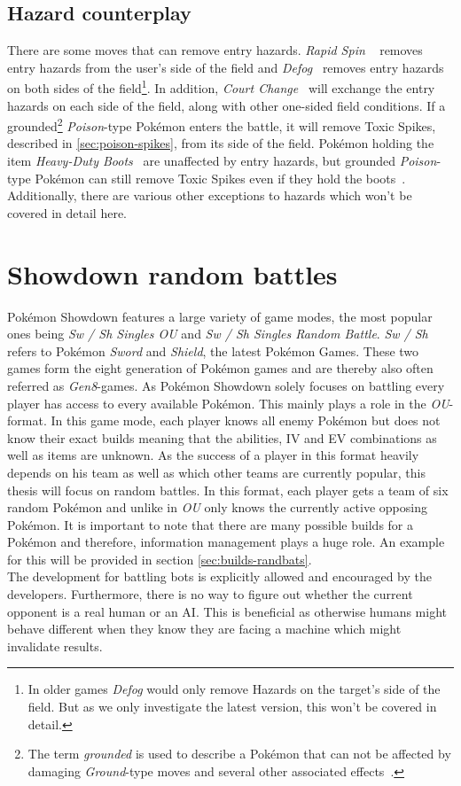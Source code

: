 \subsection{Hazard counterplay}
There are some moves that can remove entry hazards. \textit{Rapid Spin} 
~\autocite{Bulbapedia:RapidSpin} removes entry hazards from the user's side of the field and
\textit{Defog}~\autocite{Bulbapedia:Defog} removes entry hazards on both sides of the 
field\footnote{In older games \textit{Defog} would only remove Hazards on the
target's side of the field. But as we only investigate the latest version, this
won't be covered in detail.}. In addition, 
\textit{Court Change}~\autocite{Bulbapedia:CourtChange} will exchange the entry hazards
on each side of the field, along with other one-sided field conditions.
If a grounded\footnote{The term \textit{grounded} is used to describe a Pokémon that
can not be affected by damaging \textit{Ground}-type moves and several other associated 
effects~\autocite{Bulbapedia:Grounded}.}
\textit{Poison}-type Pokémon enters the battle, it will remove Toxic 
Spikes, described in \ref{sec:poison-spikes}, from its side of the field.
Pokémon holding the item 
\textit{Heavy-Duty Boots}~\autocite{Bulbapedia:HeavyDutyBoots} are unaffected by
entry hazards, but grounded \textit{Poison}-type Pokémon can still remove
Toxic Spikes even if they hold the boots~\autocite{Bulbapedia:EntryHazards}.
Additionally, there are various other exceptions to hazards which won't be covered in detail here.

\section{Showdown random battles}
Pokémon Showdown features a large variety of game modes, the most popular ones being \textit{Sw / Sh Singles OU} and
\textit{Sw / Sh Singles Random Battle}. \textit{Sw / Sh} refers to Pokémon \textit{Sword} and \textit{Shield}, the latest
Pokémon Games. These two games form the eight generation of Pokémon games and are thereby also often referred as 
\textit{Gen8}-games. As Pokémon Showdown solely focuses
on battling every player has access to every available Pokémon. This mainly plays a role in the \textit{OU}-format.
In this game mode, each player knows all enemy Pokémon but does not know their exact builds meaning that the abilities,
\ac{IV} and \ac{EV} combinations as well as items are unknown. As the success of a player in this format heavily depends
on his team as well as which other teams are currently popular, this thesis will focus on random battles. In this 
format, each player gets a team of six random Pokémon and unlike in \textit{OU} only knows the currently active
opposing Pokémon. It is important to note that there are many possible builds for a Pokémon and therefore, information
management plays a huge role. An example for this will be provided in section \ref{sec:builds-randbats}. \\
The development for battling bots is explicitly allowed and encouraged by the developers. Furthermore, there is 
no way to figure out whether the current opponent is a real human or an AI. This is beneficial as otherwise humans
might behave different when they know they are facing a machine which might invalidate results. 

